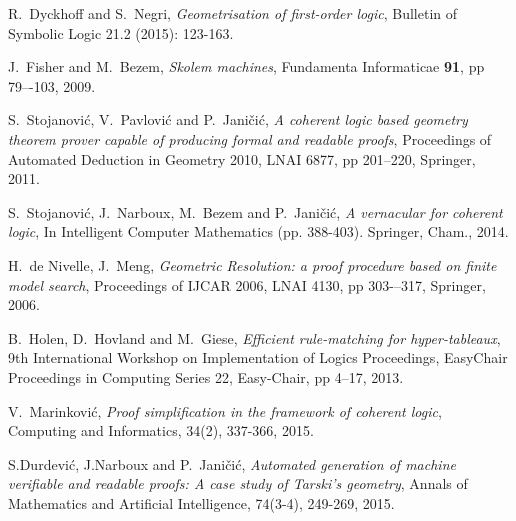 \documentclass[english,letter paper,12pt,reqno]{article}
\theoremstyle{example}
\begin{document}
\begin{thebibliography}{BHLS03}
R.~Dyckhoff and S.~Negri, \textsl{Geometrisation of first-order logic}, Bulletin of Symbolic Logic 21.2 (2015): 123-163.

J.~Fisher and M.~Bezem, \textsl{Skolem machines}, Fundamenta Informaticae \textbf{91}, pp 79–-103, 2009.

S.~Stojanovi\'{c}, V.~Pavlovi\'{c} and P.~Jani\v{c}i\'{c}, \textsl{A coherent logic based geometry theorem prover capable of producing formal and readable proofs}, Proceedings of Automated Deduction in Geometry 2010, LNAI 6877, pp 201–220, Springer, 2011.

S.~Stojanovi\'{c}, J.~Narboux, M.~Bezem and P.~Jani\v{c}i\'{c}, \textsl{A vernacular for coherent logic}, In Intelligent Computer Mathematics (pp. 388-403). Springer, Cham., 2014.

H.~de Nivelle, J.~Meng, \textsl{Geometric Resolution: a proof procedure based on finite model search}, Proceedings of IJCAR 2006, LNAI 4130, pp 303-–317, Springer, 2006.

B.~Holen, D.~Hovland and M.~Giese, \textsl{Efficient rule-matching for hyper-tableaux}, 9th International Workshop on Implementation of Logics Proceedings, EasyChair Proceedings in Computing Series 22, Easy-Chair, pp 4–17, 2013.

V.~Marinkovi\'{c}, \textsl{Proof simplification in the framework of coherent logic}, Computing and Informatics, 34(2), 337-366, 2015.

S.Durdevi\'c, J.Narboux and P.~Jani\v{c}i\'{c}, \textsl{Automated generation of machine verifiable and readable proofs: A case study of Tarski’s geometry}, Annals of Mathematics and Artificial Intelligence, 74(3-4), 249-269, 2015.

\end{thebibliography}
\end{document}
